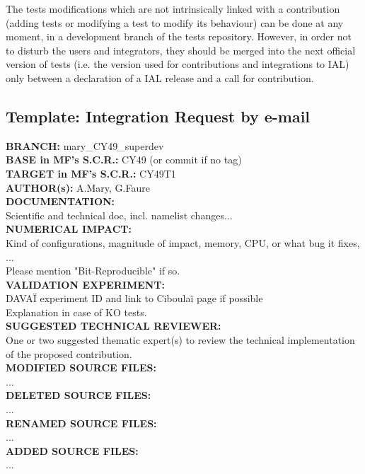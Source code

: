 \documentclass[a4paper,10pt,twoside]{article}
\begin{document}
The tests modifications which are not intrinsically linked with a contribution (adding tests or modifying a test to modify its behaviour) can be done at any moment, in a development branch of the tests repository. However, in order not to disturb the users and integrators, they should be merged into the next official version of tests (i.e. the version used for contributions and integrations to IAL) only between a declaration of a IAL release and a call for contribution.

\newpage
\begin{appendix}

\section{Template: Integration Request by e-mail\label{appx:template}}

\vspace{1cm}

\textbf{BRANCH:} mary\_CY49\_superdev\\
\textbf{BASE in MF's S.C.R.:} CY49 (or commit if no tag)\\
\textbf{TARGET in MF's S.C.R.:} CY49T1\\
\textbf{AUTHOR(s):} A.Mary, G.Faure\\

\noindent\textbf{DOCUMENTATION:}\\
Scientific and technical doc, incl. namelist changes...\\

\noindent\textbf{NUMERICAL IMPACT:}\\
Kind of configurations, magnitude of impact, memory, CPU, or what bug it fixes, ...\\
Please mention "Bit-Reproducible" if so.\\

\noindent\textbf{VALIDATION EXPERIMENT:}\\
DAVAÏ experiment ID and link to Ciboulaï page if possible\\
Explanation in case of KO tests.\\

\noindent\textbf{SUGGESTED TECHNICAL REVIEWER:}\\
One or two suggested thematic expert(s) to review the technical implementation of the proposed contribution.\\

\noindent\textbf{MODIFIED SOURCE FILES:}\\
...\\

\noindent\textbf{DELETED SOURCE FILES:}\\
...\\

\noindent\textbf{RENAMED SOURCE FILES:}\\
...\\

\noindent\textbf{ADDED SOURCE FILES:}\\
...\\

\end{appendix}
\end{document}

